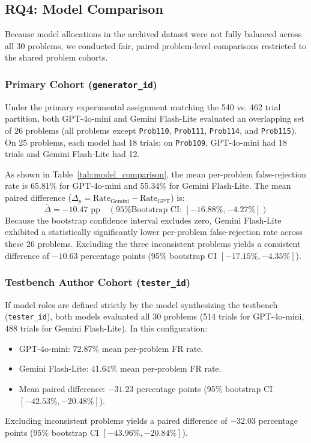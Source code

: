 \documentclass[conference]{IEEEtran}
\begin{document}
\subsection{RQ4: Model Comparison}
Because model allocations in the archived dataset were not fully balanced across all 30 problems, we conducted fair, paired problem-level comparisons restricted to the shared problem cohorts.

\subsubsection{Primary Cohort (\texttt{generator\_id})}
Under the primary experimental assignment matching the 540 vs. 462 trial partition, both GPT-4o-mini and Gemini Flash-Lite evaluated an overlapping set of 26 problems (all problems except \texttt{Prob110}, \texttt{Prob111}, \texttt{Prob114}, and \texttt{Prob115}). On 25 problems, each model had 18 trials; on \texttt{Prob109}, GPT-4o-mini had 18 trials and Gemini Flash-Lite had 12.

As shown in Table~\ref{tab:model_comparison}, the mean per-problem false-rejection rate is 65.81\% for GPT-4o-mini and 55.34\% for Gemini Flash-Lite. The mean paired difference ($\Delta_p = \text{Rate}_{\text{Gemini}} - \text{Rate}_{\text{GPT}}$) is:
\begin{equation}
\bar{\Delta} = -10.47 \text{ pp} \quad (\text{95\% Bootstrap CI: } [-16.88\%, -4.27\%])
\end{equation}
Because the bootstrap confidence interval excludes zero, Gemini Flash-Lite exhibited a statistically significantly lower per-problem false-rejection rate across these 26 problems. Excluding the three inconsistent problems yields a consistent difference of $-10.63$ percentage points (95\% bootstrap CI $[-17.15\%, -4.35\%]$).

\subsubsection{Testbench Author Cohort (\texttt{tester\_id})}
If model roles are defined strictly by the model synthesizing the testbench (\texttt{tester\_id}), both models evaluated all 30 problems (514 trials for GPT-4o-mini, 488 trials for Gemini Flash-Lite). In this configuration:
\begin{itemize}
    \item GPT-4o-mini: 72.87\% mean per-problem FR rate.
    \item Gemini Flash-Lite: 41.64\% mean per-problem FR rate.
    \item Mean paired difference: $-31.23$ percentage points (95\% bootstrap CI $[-42.53\%, -20.48\%]$).
\end{itemize}
Excluding inconsistent problems yields a paired difference of $-32.03$ percentage points (95\% bootstrap CI $[-43.96\%, -20.84\%]$).
\end{document}

